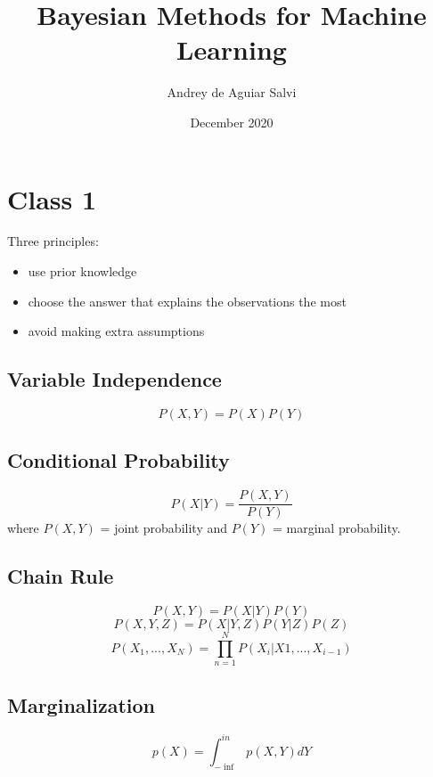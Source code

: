 \documentclass{article}
\title{Bayesian Methods for Machine Learning}
\author{Andrey de Aguiar Salvi}
\date{December 2020}
\begin{document}
\maketitle

\section{Class 1}
Three principles:
\begin{itemize}
    \item use prior knowledge
	\item choose the answer that explains the observations the most
    \item avoid making extra assumptions
\end{itemize}
		
\subsection{Variable Independence}
\begin{equation}
	P(X, Y) = P(X)P(Y)
\end{equation}
	
\subsection{Conditional Probability}
\begin{equation}
    P(X|Y) = \frac{P(X, Y)}{P(Y)}
\end{equation}
where $P(X, Y)$ = joint probability and $P(Y)$ = marginal probability.
		
\subsection{Chain Rule}
\begin{equation}
    P(X,Y) = P(X|Y)P(Y)
\end{equation}
\begin{equation}
	P(X, Y, Z) = P(X|Y, Z)P(Y|Z)P(Z)
\end{equation}
\begin{equation}
	P(X_1, ..., X_N) = \prod_{n=1}^{N} P(X_i|X1, ..., X_{i-1})
\end{equation}
		
\subsection{Marginalization}
\begin{equation}	
	p(X) = \int_{-\inf}^{in} p(X, Y)dY
\end{equation}
		
\end{document}
